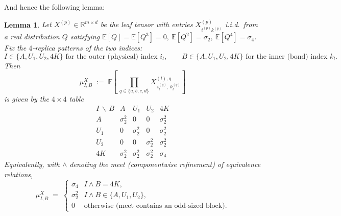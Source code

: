 \documentclass[12pt,a4paper]{article}
\newtheorem{lemma}[theorem]{Lemma}
\begin{document}
And hence the following lemma:\begin{lemma}\label{lem:X-leaf-full}
Let $X^{(p)} \in \mathbb{R}^{m \times d}$ be the leaf tensor with entries 
$X^{(p)}_{i^{(p)}k^{(p)}}$ i.i.d.\ from a real distribution $Q$ satisfying 
$\mathbb{E}[Q] = \mathbb{E}[Q^3] = 0,\ \mathbb{E}[Q^2] = \sigma_2,\ 
\mathbb{E}[Q^4] = \sigma_4$. Fix the $4$-replica patterns of the two indices:
\[
I \in \{A, U_1, U_2, 4K\} \text{ for the outer (physical) index } i_l, \qquad
B \in \{A, U_1, U_2, 4K\} \text{ for the inner (bond) index } k_l.
\]
Then
\[
\mu^X_{I,B} \;:=\; \mathbb{E}\!\left[\,\prod_{q\in\{a,b,c,d\}} 
X^{(l),q}_{\,i^{(q)}_l,\,k^{(q)}_l}\right]
\]
is given by the $4\times 4$ table
\[
\begin{array}{c|cccc}
I\,\backslash\,B & A & U_1 & U_2 & 4K \\ \hline
A   & \sigma_2^2 & 0          & 0          & \sigma_2^2 \\
U_1 & 0          & \sigma_2^2 & 0          & \sigma_2^2 \\
U_2 & 0          & 0          & \sigma_2^2 & \sigma_2^2 \\
4K  & \sigma_2^2 & \sigma_2^2 & \sigma_2^2 & \sigma_4
\end{array}
\]
Equivalently, with $\wedge$ denoting the meet (componentwise refinement) of equivalence relations,
\[
\mu^X_{I,B} \;=\;
\begin{cases}
\sigma_4    & I\wedge B = 4K,\\
\sigma_2^2  & I\wedge B \in \{A,U_1,U_2\},\\
0           & \text{otherwise (meet contains an odd-sized block).}
\end{cases}
\]
\end{lemma}
\end{document}
